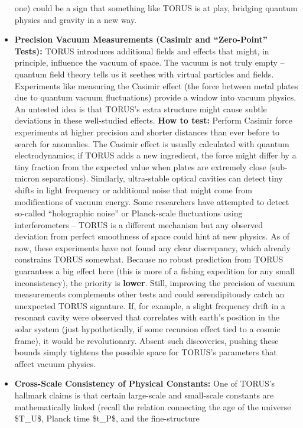 \documentclass[]{article}
\begin{document}
\begin{itemize}
  one) could be a sign that something like TORUS is at play, bridging
  quantum physics and gravity in a new way.
\item
  \textbf{Precision Vacuum Measurements (Casimir and ``Zero-Point''
  Tests):} TORUS introduces additional fields and effects that might, in
  principle, influence the vacuum of space. The vacuum is not truly
  empty -- quantum field theory tells us it seethes with virtual
  particles and fields. Experiments like measuring the Casimir effect
  (the force between metal plates due to quantum vacuum fluctuations)
  provide a window into vacuum physics. An untested idea is that TORUS's
  extra structure might cause subtle deviations in these well-studied
  effects. \textbf{How to test:} Perform Casimir force experiments at
  higher precision and shorter distances than ever before to search for
  anomalies​. The Casimir effect is usually calculated with quantum
  electrodynamics; if TORUS adds a new ingredient, the force might
  differ by a tiny fraction from the expected value when plates are
  extremely close (sub-micron separations). Similarly, ultra-stable
  optical cavities can detect tiny shifts in light frequency or
  additional noise that might come from modifications of vacuum energy.
  Some researchers have attempted to detect so-called ``holographic
  noise'' or Planck-scale fluctuations using interferometers -- TORUS is
  a different mechanism but any observed deviation from perfect
  smoothness of space could hint at new physics​. As of now, these
  experiments have not found any clear discrepancy, which already
  constrains TORUS somewhat. Because no robust prediction from TORUS
  guarantees a big effect here (this is more of a fishing expedition for
  any small inconsistency), the priority is \textbf{lower}​. Still,
  improving the precision of vacuum measurements complements other tests
  and could serendipitously catch an unexpected TORUS signature. If, for
  example, a slight frequency drift in a resonant cavity were observed
  that correlates with earth's position in the solar system (just
  hypothetically, if some recursion effect tied to a cosmic frame), it
  would be revolutionary. Absent such discoveries, pushing these bounds
  simply tightens the possible space for TORUS's parameters that affect
  vacuum physics.
\item
  \textbf{Cross-Scale Consistency of Physical Constants:} One of TORUS's
  hallmark claims is that certain large-scale and small-scale constants
  are mathematically linked (recall the relation connecting the age of
  the universe \$T\_U\$, Planck time \$t\_P\$, and the fine-structure

\end{itemize}
\end{document}
